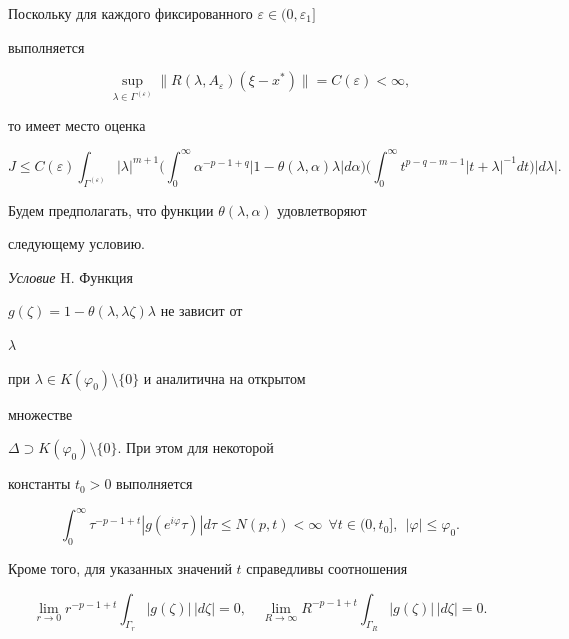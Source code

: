 Поскольку для каждого фиксированного $\varepsilon\in(0,\varepsilon_1]$ 


выполняется


$$


\sup_{\lambda\in\Gamma^{(\varepsilon)}}\|R(\lambda,A_\varepsilon)


(\xi-x^*)\|=C(\varepsilon)<\infty,


$$


то имеет место оценка


\begin{equation}


J\le C(\varepsilon)\int_{\Gamma^{(\varepsilon)}}


|\lambda|^{m+1}\bigg(\int^\infty_0 \alpha^{-p-1+q}


|1-\theta(\lambda,\alpha)\lambda|d\alpha\bigg)\bigg(


\int^\infty_0 t^{p-q-m-1}|t+\lambda|^{-1}dt\bigg)|d\lambda|.


\end{equation}


Будем предполагать, что функции $\theta(\lambda,\alpha)$ удовлетворяют 


следующему условию.


\medskip





{\it Условие} H. Функция 


$g(\zeta)=1-\theta(\lambda,\lambda\zeta)\lambda$ не зависит от 


$\lambda$


при $\lambda\in K(\varphi_0)\setminus\{0\}$ и аналитична на открытом 


множестве 


$\Delta\supset K(\varphi_0)\setminus\{0\}$. При этом для некоторой 


константы $t_0>0$ выполняется


\begin{equation}


\int^\infty_0 \tau^{-p-1+t}|g(e^{i\varphi}\tau)|d\tau\le


N(p,t)<\infty\ \ \forall t\in(0,t_0],\ \ |\varphi|\le\varphi_0.


\end{equation}


Кроме того, для указанных значений $t$ справедливы соотношения


\begin{equation}


\lim_{r\to0}r^{-p-1+t}\int_{\Gamma_r}|g(\zeta)|\,|d\zeta|=0,\quad


\lim_{R\to\infty}R^{-p-1+t}\int_{\Gamma_R}|g(\zeta)|\,|d\zeta|=0.


\end{equation}





